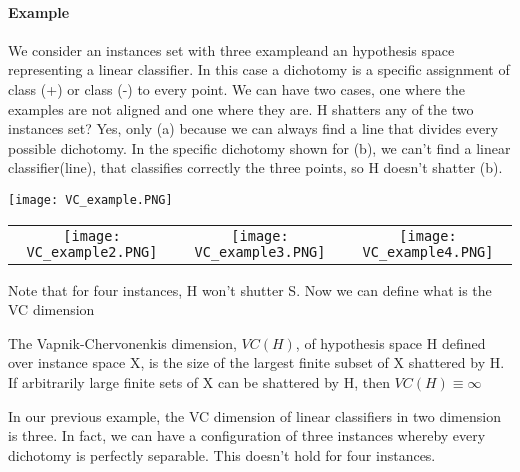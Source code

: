 \documentclass[main.tex]{subfiles}
\begin{document}
\paragraph{Example} We consider an instances set with three example\footnotemark and an hypothesis space representing a linear classifier. In this case a dichotomy is a specific assignment of class (+) or class (-) to every point. We can have two cases, one where the examples are not aligned and one where they are. H shatters any of the two instances set? Yes, only (a) because we can always find a line that divides every possible dichotomy. In the specific dichotomy shown for (b), we can't find a linear classifier(line), that classifies correctly the three points, so H doesn't shatter (b). 
\begin{center}
    \texttt{[image: VC\_example.PNG]}
\end{center}
\begin{center}
\begin{tabular}{ccc}
  \texttt{[image: VC\_example2.PNG]} &   \texttt{[image: VC\_example3.PNG]}&
  \texttt{[image: VC\_example4.PNG]}
\end{tabular}
\end{center}
Note that for four instances, H won't shutter S.\footnotemark {}
Now we can define what is the VC dimension
\begin{definition}[VC dimension]
The Vapnik-Chervonenkis dimension, $VC(H)$, of hypothesis space H
defined over instance space X, is the size of the largest finite subset of X shattered by H. If arbitrarily large finite sets of X can be shattered by H, then $VC(H) \equiv \infty$
\end{definition}
In our previous example, the VC dimension of linear classifiers in two dimension is three. In fact, we can have a configuration of three instances whereby every dichotomy is perfectly separable. This doesn't hold for four instances.
\end{document}
